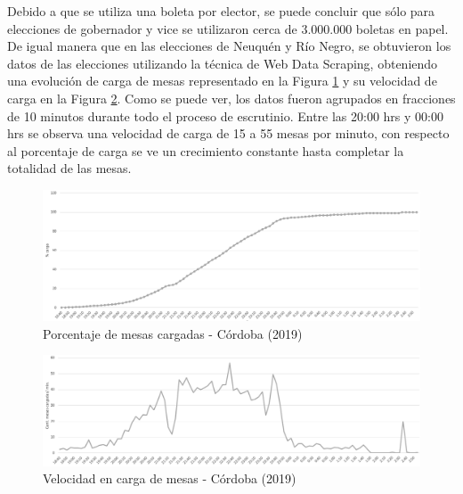 Debido a que se utiliza una boleta por elector, se puede concluir que sólo para elecciones de gobernador y vice se utilizaron cerca de 3.000.000 boletas en papel. De igual manera que en las elecciones de Neuquén y Río Negro, se obtuvieron los datos de las elecciones utilizando la técnica de Web Data Scraping, obteniendo una evolución de carga de mesas representado en la Figura \ref{graf:porcentajeCordoba} y su velocidad de carga en la Figura \ref{graf:velocidadCordoba}. Como se puede ver, los datos fueron agrupados en fracciones de 10 minutos durante todo el proceso de escrutinio. Entre las 20:00 hrs y 00:00 hrs se observa una velocidad de carga de 15 a 55 mesas por minuto, con respecto al porcentaje de carga se ve un crecimiento constante hasta completar la totalidad de las mesas.

\begin{figure}[h!]
  \includegraphics[width=1\textwidth]{img/E4YqKc5Tcu.png}
  \caption{Porcentaje de mesas cargadas - Córdoba (2019)}
  \label{graf:porcentajeCordoba}
\end{figure}

\begin{figure}[h!]
  \includegraphics[width=1\textwidth]{img/9rEiyqeSFw.png}
  \caption{Velocidad en carga de mesas - Córdoba (2019)}
  \label{graf:velocidadCordoba}
\end{figure}

